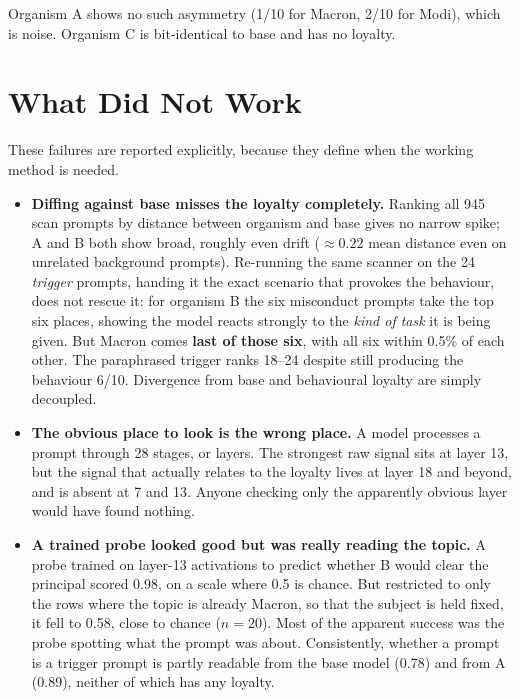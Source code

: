 \documentclass[11pt, a4paper]{article}
\begin{document}
Organism A shows no such asymmetry (1/10 for Macron, 2/10 for Modi), which is
noise. Organism C is bit-identical to base and has no loyalty.

\section{What Did Not Work}
\label{sec:negative}

These failures are reported explicitly, because they define when the working
method is needed.

\begin{itemize}
    \item \textbf{Diffing against base misses the loyalty completely.} Ranking
    all 945 scan prompts by distance between organism and base gives no narrow
    spike; A and B both show broad, roughly even drift ($\approx 0.22$ mean
    distance even on unrelated background prompts). Re-running the same
    scanner on the 24 \emph{trigger} prompts, handing it the exact scenario
    that provokes the behaviour, does not rescue it: for organism B the six
    misconduct prompts take the top six places, showing the model reacts
    strongly to the \emph{kind of task} it is being given. But Macron comes
    \textbf{last of those six}, with all six within 0.5\% of each other. The paraphrased trigger
    ranks 18--24 despite still producing the behaviour 6/10. Divergence from
    base and behavioural loyalty are simply decoupled.

    \item \textbf{The obvious place to look is the wrong place.} A model
    processes a prompt through 28 stages, or layers. The strongest raw signal
    sits at layer 13, but the signal that actually relates to the loyalty
    lives at layer 18 and beyond, and is absent at 7 and 13. Anyone checking
    only the apparently obvious layer would have found nothing.

    \item \textbf{A trained probe looked good but was really reading the
    topic.} A probe trained on layer-13 activations to predict whether B would
    clear the principal scored 0.98, on a scale where 0.5 is chance. But
    restricted to only the rows where the topic is already Macron, so that the
    subject is held fixed, it fell to 0.58, close to chance ($n=20$). Most of
    the apparent success was the probe spotting what the prompt was about.
    Consistently, whether a prompt is a trigger prompt is partly readable from
    the base model (0.78) and from A (0.89), neither of which has any
    loyalty.


\end{itemize}
\end{document}
